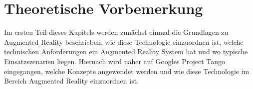 \chapter{Theoretische Vorbemerkung}

Im ersten Teil dieses Kapitels werden zunächst einmal die Grundlagen zu Augmented Reality beschrieben, wie diese Technologie einzuordnen ist, welche technischen Anforderungen ein Augmented Reality System hat und wo typische Einsatzszenarien liegen. Hiernach wird näher auf Googles Project Tango eingegangen, welche Konzepte angewendet werden und wie diese Technologie im Bereich Augmented Reality einzuordnen ist. \\






